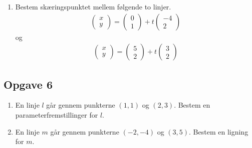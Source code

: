\begin{enumerate}[label=\roman*)]
	\item Bestem skæringspunktet mellem følgende to linjer. 
	\begin{align*}
 		\begin{pmatrix}
 			x \\ y
 		\end{pmatrix}
 		=
 		\begin{pmatrix}
 			0 \\ 1
 		\end{pmatrix}
 		+
 		t
 		\begin{pmatrix}
 			-4 \\ 2
 		\end{pmatrix}
 	\end{align*}  
 	og
 	\begin{align*}
 		\begin{pmatrix}
 			 x \\ y
 		\end{pmatrix}
 		=
 		\begin{pmatrix}
 			5 \\ 2
 		\end{pmatrix}
 		+
 		t
 		\begin{pmatrix}
 			3 \\ 2
 		\end{pmatrix}
 	\end{align*}
 	
 	
\end{enumerate}

\subsection*{Opgave 6}
\begin{enumerate}[label=\roman*)]
	\item En linje $l$ går gennem punkterne $(1,1)$ og $(2,3)$. Bestem en parameterfremstillinger for 
	$l$. 
	\item En linje $m$ går gennem punkterne $(-2,-4)$ og $(3,5)$. Bestem en ligning for $m$. 
\end{enumerate}

